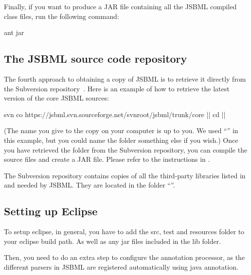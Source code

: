Finally, if you want to produce a JAR file containing all the JSBML
compiled class files, run the following command:

\begin{example}[style=bash, title={Creating a JAR file.}]
ant jar
\end{example}



\subsection{The JSBML source code repository}
\label{sec:SourceDistribution}

The fourth approach to obtaining a copy of JSBML is to retrieve it directly
from the Subversion repository~\cite{JSBMLSVN}.  Here is an example of how
to retrieve the latest version of the core JSBML sources:

\newcommand{\dirname}{\code{\emph{\color{winered}jsbml}}\xspace}

\begin{example}[style=bash, title={Downloading the latest JSBML 
    sources from the JSBML project's Subversion repository.}]
svn co https://jsbml.svn.sourceforge.net/svnroot/jsbml/trunk/core |\dirname|
cd |\dirname|
\end{example}

(The name you give to the copy on your computer is up to you.  We used
``\dirname'' in this example, but you could name the folder something else
if you wish.)  Once you have retrieved the folder from the Subversion
repository, you can compile the source files and create a JAR file.  Please
refer to the instructions in .

The Subversion repository contains copies of all the third-party libraries
listed in  and needed by JSBML.  They are
located in the folder ``\dirname{}''.


\subsection{Setting up Eclipse}
\label{sec:SettingUpEclipse}

To setup eclipse, in general, you have to add the src, test and resources 
folder to your eclipse build path. As well as any jar files included in the
lib folder.

Then, you need to do an extra step to configure the annotation processor, as 
the different parsers in JSBML are registered automatically using java annotation.

